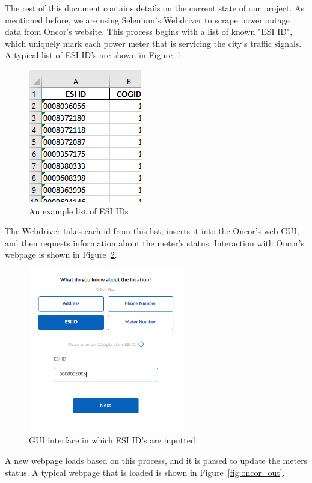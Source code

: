 \documentclass[]{article}
\begin{document}
The rest of this document contains details on the current state of our project. As mentioned before, we are using Selenium's Webdriver to scrape power outage data from Oncor's website. This process begins with a list of known "ESI ID", which uniquely mark each power meter that is servicing the city's traffic signals. A typical list of ESI ID's are shown in Figure~\ref{fig:ids}.
\begin{figure}[htbp]
    \centering
    \includegraphics{esi_id.PNG}
    \caption[short]{An example list of ESI IDs}
    \label{fig:ids}
\end{figure}
The Webdriver takes each id from this list, inserts it into the Oncor's web GUI, and then requests information about the meter's status. Interaction with Oncor's webpage is shown in Figure~\ref{fig:oncor_in}. 
\begin{figure}[h]
    \centering
    \includegraphics[width=0.6\textwidth]{oncor_esi_in.PNG}
    \caption{GUI interface in which ESI ID's are inputted}
    \label{fig:oncor_in}    
\end{figure}
A new webpage loads based on this process, and it is parsed to update the meters status. A typical webpage that is loaded is shown in Figure~\ref{fig:oncor_out}.
\end{document}
